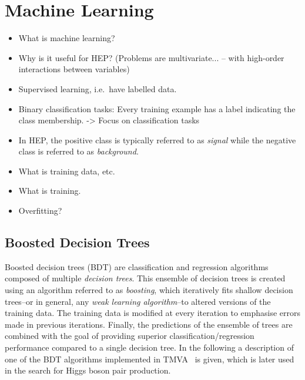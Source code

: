 \section{Machine Learning}

\begin{itemize}
\item What is machine learning?

\item Why is it useful for HEP? (Problems are multivariate... -- with high-order
  interactions between variables)

\item Supervised learning, i.e.\ have labelled data.

\item Binary classification tasks: Every training example has a label indicating
  the class membership. -> Focus on classification tasks

\item In HEP, the positive class is typically referred to as \emph{signal} while
  the negative class is referred to as \emph{background}.

\item What is training data, etc.

\item What is training.

\item Overfitting?
\end{itemize}


\subsection{Boosted Decision Trees}

Boosted decision trees (BDT) are classification and regression algorithms
composed of multiple \emph{decision trees}. This ensemble of decision trees is
created using an algorithm referred to as \emph{boosting}, which iteratively
fits shallow decision trees--or in general, any \emph{weak learning
  algorithm}--to altered versions of the training data. The training data is
modified at every iteration to emphasise errors made in previous
iterations. Finally, the predictions of the ensemble of trees are combined with
the goal of providing superior classification/regression performance compared to
a single decision tree. In the following a description of one of the BDT
algorithms implemented in \textsc{TMVA}~\cite{TMVA} is given, which is later
used in the search for Higgs boson pair production.


